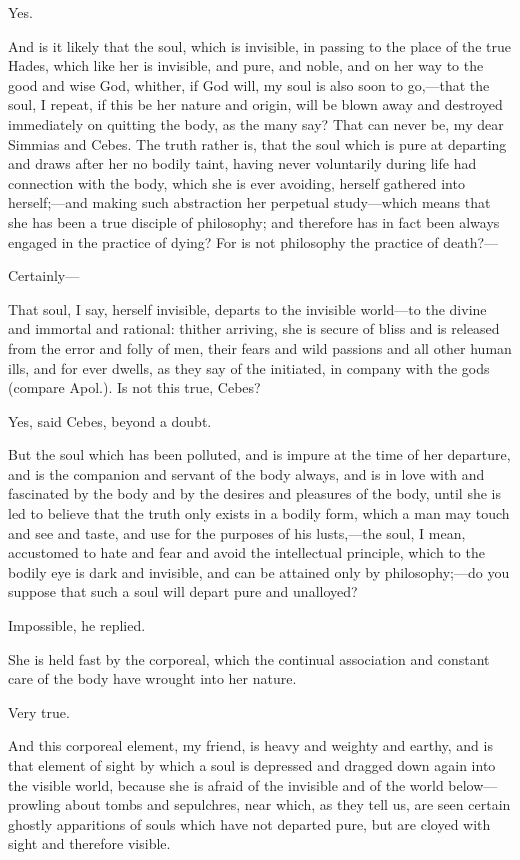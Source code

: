 Yes.

And is it likely that the soul, which is invisible, in passing to the
place of the true Hades, which like her is invisible, and pure, and noble,
and on her way to the good and wise God, whither, if God will, my soul is
also soon to go,—that the soul, I repeat, if this be her nature and
origin, will be blown away and destroyed immediately on quitting the body,
as the many say? That can never be, my dear Simmias and Cebes. The truth
rather is, that the soul which is pure at departing and draws after her no
bodily taint, having never voluntarily during life had connection with the
body, which she is ever avoiding, herself gathered into herself;—and
making such abstraction her perpetual study—which means that she has
been a true disciple of philosophy; and therefore has in fact been always
engaged in the practice of dying? For is not philosophy the practice of
death?—

Certainly—

That soul, I say, herself invisible, departs to the invisible world—to
the divine and immortal and rational: thither arriving, she is secure of
bliss and is released from the error and folly of men, their fears and
wild passions and all other human ills, and for ever dwells, as they say
of the initiated, in company with the gods (compare Apol.). Is not this
true, Cebes?

Yes, said Cebes, beyond a doubt.

But the soul which has been polluted, and is impure at the time of her
departure, and is the companion and servant of the body always, and is in
love with and fascinated by the body and by the desires and pleasures of
the body, until she is led to believe that the truth only exists in a
bodily form, which a man may touch and see and taste, and use for the
purposes of his lusts,—the soul, I mean, accustomed to hate and fear
and avoid the intellectual principle, which to the bodily eye is dark and
invisible, and can be attained only by philosophy;—do you suppose
that such a soul will depart pure and unalloyed?

Impossible, he replied.

She is held fast by the corporeal, which the continual association and
constant care of the body have wrought into her nature.

Very true.

And this corporeal element, my friend, is heavy and weighty and earthy,
and is that element of sight by which a soul is depressed and dragged down
again into the visible world, because she is afraid of the invisible and
of the world below—prowling about tombs and sepulchres, near which,
as they tell us, are seen certain ghostly apparitions of souls which have
not departed pure, but are cloyed with sight and therefore visible.

